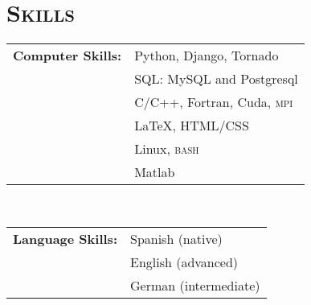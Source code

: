 \documentclass[a4paper, 10pt]{article}
\begin{document}
\section{\textsc{Skills}}
\vspace*{1mm}
\hspace*{-0.7cm}\begin{tabular}{ll}
{\bf Computer Skills:}
      & Python, Django, Tornado\vspace*{1mm}\\ 
      & SQL:  MySQL and Postgresql\vspace*{1mm}\\ 
      & C/C++, Fortran, Cuda, \textsc{mpi}\vspace*{1mm}\\
      & {\LaTeX}, HTML/CSS\vspace*{1mm}\\
      & Linux, \textsc{bash}\vspace*{1mm}\\
      & Matlab\\
\end{tabular}\\[0.5pt]

\vspace*{1mm}
\hspace*{-0.7cm}\begin{tabular}{ll}
{\bf Language Skills:} &
      Spanish (native)\vspace*{1mm}\\
    & English (advanced)\vspace*{1mm}\\
    & German (intermediate)\\
\end{tabular}


\vspace*{4mm}
\end{document}
